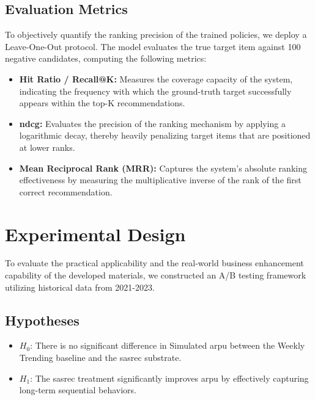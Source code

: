 \documentclass[conference]{IEEEtran}
\begin{document}
\subsection{Evaluation Metrics}
To objectively quantify the ranking precision of the trained policies, we deploy a Leave-One-Out protocol. The model evaluates the true target item against 100 negative candidates, computing the following metrics:
\begin{itemize}
    \item \textbf{Hit Ratio / Recall@K:} Measures the coverage capacity of the system, indicating the frequency with which the ground-truth target successfully appears within the top-K recommendations.
    \item \textbf{\gls{ndcg}:} Evaluates the precision of the ranking mechanism by applying a logarithmic decay, thereby heavily penalizing target items that are positioned at lower ranks.
    \item \textbf{Mean Reciprocal Rank (MRR):} Captures the system's absolute ranking effectiveness by measuring the multiplicative inverse of the rank of the first correct recommendation.
\end{itemize}

\section{Experimental Design}
To evaluate the practical applicability and the real-world business enhancement capability of the developed materials, we constructed an A/B testing framework utilizing historical data from 2021-2023.

\subsection{Hypotheses}
\begin{itemize}
    \item $H_0$: There is no significant difference in Simulated \gls{arpu} between the Weekly Trending baseline and the \gls{sasrec} substrate.
    \item $H_1$: The \gls{sasrec} treatment significantly improves \gls{arpu} by effectively capturing long-term sequential behaviors.
\end{itemize}
\end{document}
